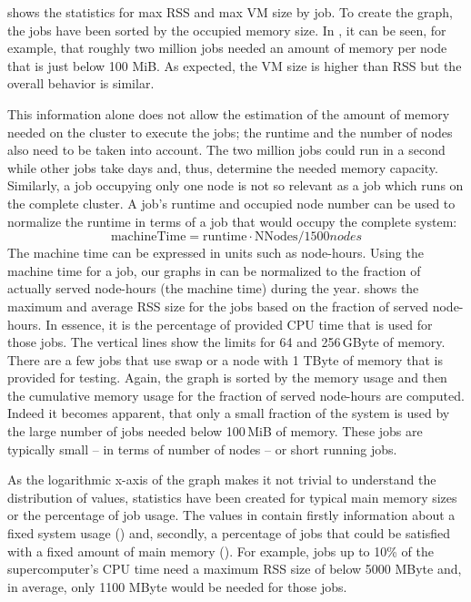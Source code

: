 \documentclass{../../template/esiwace-report}
\begin{document}
 shows the statistics for max RSS and max VM size by job.
To create the graph, the jobs have been sorted by the occupied memory size.
In , it can be seen, for example, that roughly two million jobs needed an amount of memory per node that is just below 100 MiB.
As expected, the VM size is higher than RSS but the overall behavior is similar.

This information alone does not allow the estimation of the amount of memory needed on the cluster to execute the jobs; the runtime and the number of nodes also need to be taken into account.
The two million jobs could run in a second while other jobs take days and, thus, determine the needed memory capacity.
Similarly, a job occupying only one node is not so relevant as a job which runs on the complete cluster.
A job's runtime and occupied node number can be used to normalize the runtime in terms of a job that would occupy the complete system:
\[ \mathrm{machineTime} = \mathrm{runtime} \cdot \mathrm{NNodes} / 1500 nodes\]
The machine time can be expressed in units such as node-hours.
Using the machine time for a job, our graphs in  can be normalized to the fraction of actually served node-hours (the machine time) during the year.
 shows the maximum and average RSS size for the jobs based on the fraction of served node-hours.
In essence, it is the percentage of provided CPU time that is used for those jobs.
The vertical lines show the limits for 64 and 256\,GByte of memory.
There are a few jobs that use swap or a node with 1 TByte of memory that is provided for testing.
Again, the graph is sorted by the memory usage and then the cumulative memory usage for the fraction of served node-hours are computed.
Indeed it becomes apparent, that only a small fraction of the system is used by the large number of jobs needed below 100\,MiB of memory.
These jobs are typically small -- in terms of number of nodes -- or short running jobs.


As the logarithmic x-axis of the graph makes it not trivial to understand the distribution of values, statistics have been created for typical main memory sizes or the percentage of job usage.
The values in  contain firstly information about a fixed system usage () and, secondly, a percentage of jobs that could be satisfied with a fixed amount of main memory ().
For example, jobs up to 10\% of the supercomputer's CPU time need a maximum RSS size of below 5000 MByte and, in average, only 1100 MByte would be needed for those jobs.
\end{document}
